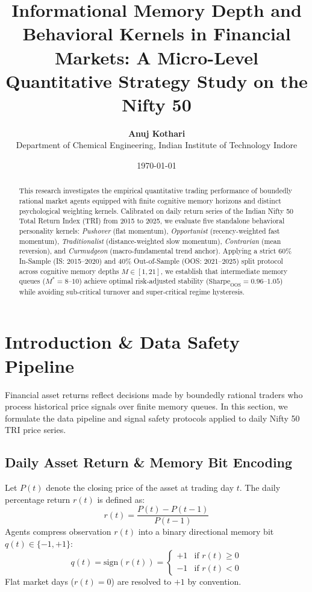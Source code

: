 \documentclass[11pt,a4paper]{article}
\title{\textbf{Informational Memory Depth and Behavioral Kernels in Financial Markets: A Micro-Level Quantitative Strategy Study on the Nifty 50}}
\author{\textbf{Anuj Kothari} \\ Department of Chemical Engineering, Indian Institute of Technology Indore}
\date{\today}
\begin{document}
\maketitle

\begin{abstract}
This research investigates the empirical quantitative trading performance of boundedly rational market agents equipped with finite cognitive memory horizons and distinct psychological weighting kernels. Calibrated on daily return series of the Indian Nifty 50 Total Return Index (TRI) from 2015 to 2025, we evaluate five standalone behavioral personality kernels: \textit{Pushover} (flat momentum), \textit{Opportunist} (recency-weighted fast momentum), \textit{Traditionalist} (distance-weighted slow momentum), \textit{Contrarian} (mean reversion), and \textit{Curmudgeon} (macro-fundamental trend anchor). Applying a strict 60\% In-Sample (IS: 2015--2020) and 40\% Out-of-Sample (OOS: 2021--2025) split protocol across cognitive memory depths $M \in [1, 21]$, we establish that intermediate memory queues ($M^* = 8$--$10$) achieve optimal risk-adjusted stability ($\text{Sharpe}_{\text{OOS}} = 0.96$--$1.05$) while avoiding sub-critical turnover and super-critical regime hysteresis.
\end{abstract}

\section{Introduction \& Data Safety Pipeline}

Financial asset returns reflect decisions made by boundedly rational traders who process historical price signals over finite memory queues. In this section, we formulate the data pipeline and signal safety protocols applied to daily Nifty 50 TRI price series.

\subsection{Daily Asset Return \& Memory Bit Encoding}
Let $P(t)$ denote the closing price of the asset at trading day $t$. The daily percentage return $r(t)$ is defined as:
\begin{equation}
    r(t) = \frac{P(t) - P(t-1)}{P(t-1)}
\end{equation}
Agents compress observation $r(t)$ into a binary directional memory bit $q(t) \in \{-1, +1\}$:
\begin{equation}
    q(t) = \text{sign}(r(t)) = 
    \begin{cases} 
        +1 & \text{if } r(t) \ge 0 \\ 
        -1 & \text{if } r(t) < 0 
    \end{cases}
\end{equation}
Flat market days ($r(t) = 0$) are resolved to $+1$ by convention.
\end{document}
